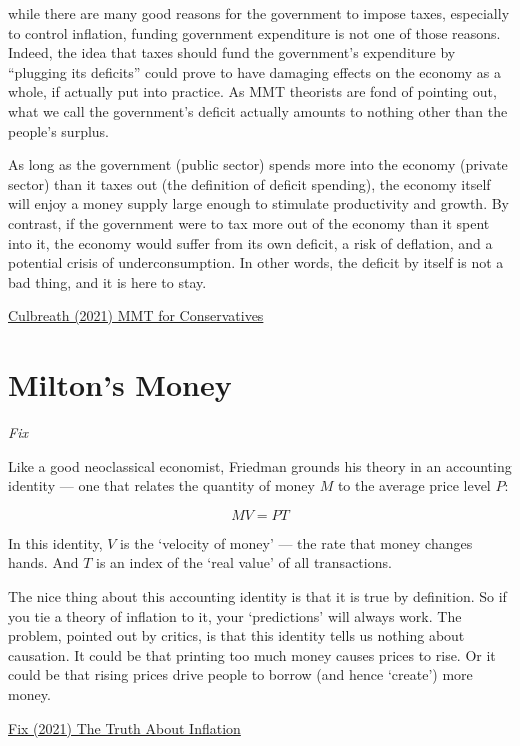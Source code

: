\documentclass[
]{book}
\begin{document}
while there are many good reasons for the government to impose taxes, especially to control inflation, funding government expenditure is not one of those reasons. Indeed, the idea that taxes should fund the government's expenditure by ``plugging its deficits'' could prove to have damaging effects on the economy as a whole, if actually put into practice. As MMT theorists are fond of pointing out, what we call the government's deficit actually amounts to nothing other than the people's surplus.

As long as the government (public sector) spends more into the economy (private sector) than it taxes out (the definition of deficit spending), the economy itself will enjoy a money supply large enough to stimulate productivity and growth. By contrast, if the government were to tax more out of the economy than it spent into it, the economy would suffer from its own deficit, a risk of deflation, and a potential crisis of underconsumption. In other words, the deficit by itself is not a bad thing, and it is here to stay.

\href{https://www.theamericanconservative.com/articles/modern-monetary-theory-for-conservatives/}{Culbreath (2021) MMT for Conservatives}

\hypertarget{miltons-money}{%
\section{Milton's Money}\label{miltons-money}}

\emph{Fix}

Like a good neoclassical economist, Friedman grounds his theory in an accounting identity --- one that relates the quantity of money \(M\) to the average price level \(P\):

\[MV=PT\]

In this identity, \(V\) is the `velocity of money' --- the rate that money changes hands. And \(T\) is an index of the `real value' of all transactions.

The nice thing about this accounting identity is that it is true by definition. So if you tie a theory of inflation to it, your `predictions' will always work. The problem, pointed out by critics, is that this identity tells us nothing about causation. It could be that printing too much money causes prices to rise. Or it could be that rising prices drive people to borrow (and hence `create') more money.

\href{https://economicsfromthetopdown.com/2021/11/24/the-truth-about-inflation/}{Fix (2021) The Truth About Inflation}
\end{document}
